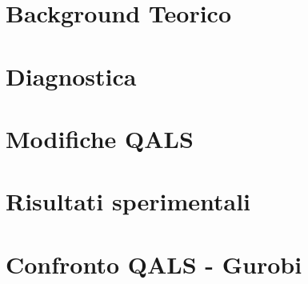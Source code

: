 \documentclass[a4paper,twoside]{book}
\begin{document}


\chapter{Background Teorico}


\chapter{Diagnostica}


\chapter{Modifiche QALS}


\chapter{Risultati sperimentali}


\chapter{Confronto QALS - Gurobi}



\end{document}
